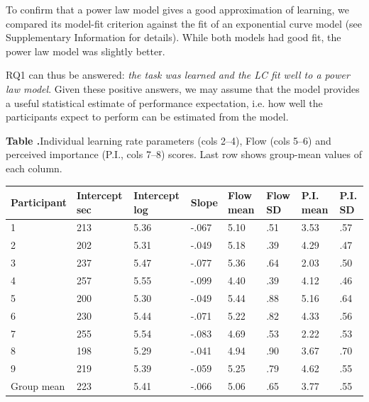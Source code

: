 \documentclass{frontierstyle/frontiersSCNS}
\begin{document}
To confirm that a power law model gives a good approximation of learning, we compared its model-fit criterion against the fit of an exponential curve model (see Supplementary Information for details). While both models had good fit, the power law model was slightly better.

RQ1 can thus be answered: {\it the task was learned and the LC fit well to a power law model}. Given these positive answers, we may assume that the model provides a useful statistical estimate of performance expectation, i.e. how well the participants expect to perform can be estimated from the model.

\begin{table}[ht]
	\centering
	\textbf{\label{tab:LCxFlow} Table .}{Individual learning rate parameters (cols 2--4), Flow (cols 5--6) and perceived importance (P.I., cols 7--8) scores. Last row shows group-mean values of each column.}
	\begin{tabular}{llllllll}
	\hline
	Participant & Intercept sec & Intercept log & Slope  & Flow mean & Flow SD & P.I. mean & P.I. SD \\
	\hline
	1           & 213     & 5.36      & -.067 & 5.10      & .51     & 3.53      & .57     \\
	2           & 202     & 5.31      & -.049 & 5.18      & .39     & 4.29      & .47     \\
	3           & 237     & 5.47      & -.077 & 5.36      & .64     & 2.03      & .50     \\
	4           & 257     & 5.55      & -.099 & 4.40      & .39     & 4.12      & .46     \\
	5           & 200     & 5.30      & -.049 & 5.44      & .88     & 5.16      & .64     \\
	6           & 230     & 5.44      & -.071 & 5.22      & .82     & 4.33      & .56     \\
	7           & 255     & 5.54      & -.083 & 4.69      & .53     & 2.22      & .53     \\
	8           & 198     & 5.29      & -.041 & 4.94      & .90     & 3.67      & .70     \\
	9           & 219     & 5.39      & -.059 & 5.25      & .79     & 4.62      & .55     \\
	\hline
	Group mean  & 223     & 5.41      & -.066 & 5.06      & .65    & 3.77      & .55    \\
	\hline
	\end{tabular}
\end{table}
\end{document}
